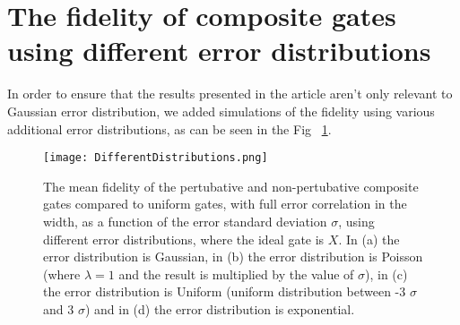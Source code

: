 \documentclass[floatfix,reprint, amsmath,amssymb,aps,superscriptaddress,nofootinbib]{revtex4-2}
\begin{document}
\begin{table}[h!]
\centering
{}
      \caption{Selected robust segmented gates achieved by the non-perturbative approach. These gates are robust against correlated errors in the widths.}
  \label{table: Numeric robust gates against correlated errors in widths}
\end{table}


\section{The fidelity of composite gates using different error distributions}
In order to ensure that the results presented in the article aren't only relevant to Gaussian error distribution, we added simulations of the fidelity using various additional error distributions, as can be seen in the Fig ~\ref{fig: different distributions}.

\begin{figure}[tb]
    \centering
    \texttt{[image: DifferentDistributions.png]}
    \caption{The mean fidelity of the pertubative and non-pertubative composite gates compared to uniform gates, with full error correlation in the width, as a function of the error standard deviation $\sigma$, using different error distributions, where the ideal gate is $X$. In (a) the error distribution is Gaussian, in (b) the error distribution is Poisson (where $\lambda=1$ and the result is multiplied by the value of $\sigma$), in (c) the error distribution is Uniform (uniform distribution between -3 $\sigma$ and 3 $\sigma$) and in (d) the error distribution is exponential.}
    \label{fig: different distributions}
\end{figure}
\end{document}

